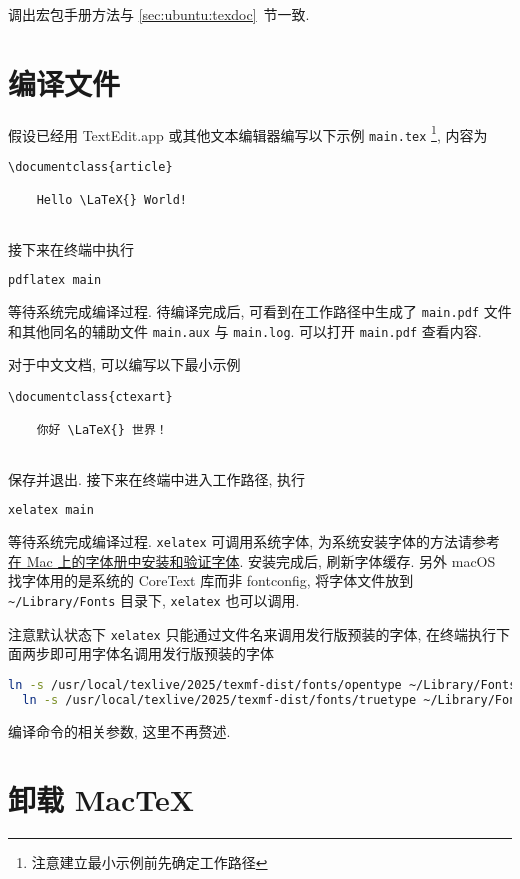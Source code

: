 调出宏包手册方法与 \ref{sec:ubuntu:texdoc}~节一致.

\section{编译文件}

假设已经用 TextEdit.app 或其他文本编辑器编写以下示例 \texttt{main.tex}%
\footnote{注意建立最小示例前先确定工作路径},
内容为
\begin{lstlisting}[language = {[LaTeX]TeX}]
  \documentclass{article}
  
    Hello \LaTeX{} World!
  
\end{lstlisting}
接下来在\textsf{终端}中执行
\begin{lstlisting}[language=bash]
  pdflatex main
\end{lstlisting}
等待系统完成编译过程. 
待编译完成后, 可看到在工作路径中生成了 \texttt{main.pdf}
文件和其他同名的辅助文件 \texttt{main.aux} 与 \texttt{main.log}.
可以打开 \texttt{main.pdf} 查看内容.

对于中文文档, 可以编写以下最小示例%
\begin{lstlisting}[language={[LaTeX]TeX}]
  \documentclass{ctexart}
  
    你好 \LaTeX{} 世界！
  
\end{lstlisting}
保存并退出.
接下来在\textsf{终端}中进入工作路径,
执行
\begin{lstlisting}[language=bash]
  xelatex main
\end{lstlisting}
等待系统完成编译过程.
\texttt{xelatex} 可调用系统字体,
为系统安装字体的方法请参考%
\href{https://support.apple.com/zh-cn/guide/font-book/fntbk1000/mac}{在 Mac 上的字体册中安装和验证字体}.
安装完成后, 刷新字体缓存.
另外 macOS 找字体用的是系统的 CoreText 库而非 fontconfig,
将字体文件放到 \verb+~/Library/Fonts+ 目录下,
\texttt{xelatex} 也可以调用.

注意默认状态下 \texttt{xelatex} 只能通过文件名来调用发行版预装的字体,
在\textsf{终端}执行下面两步即可用字体名调用发行版预装的字体
\begin{lstlisting}[language=bash]
  ln -s /usr/local/texlive/2025/texmf-dist/fonts/opentype ~/Library/Fonts/
  ln -s /usr/local/texlive/2025/texmf-dist/fonts/truetype ~/Library/Fonts/
\end{lstlisting}

编译命令的相关参数, 这里不再赘述.

\section{卸载 Mac\TeX}

